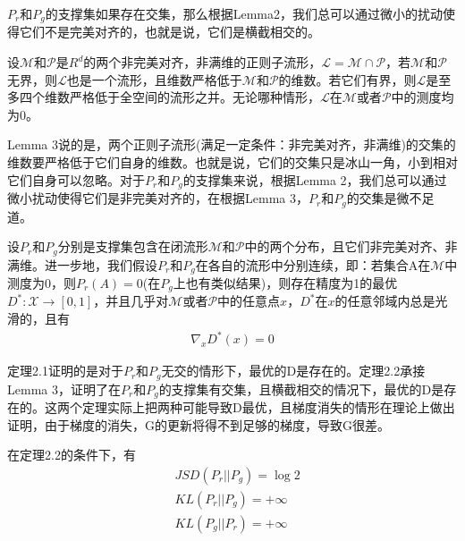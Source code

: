             $P_r$和$P_g$的支撑集如果存在交集，那么根据Lemma2，我们总可以通过微小的扰动使得它们不是完美对齐的，也就是说，它们是横截相交的。
            \begin{lemma}[Lemma 3]
            设$\mathcal{M}$和$\mathcal{P}$是$R^d$的两个非完美对齐，非满维的正则子流形，$\mathcal{L} = \mathcal{M}\cap \mathcal{P} $，若$\mathcal{M}$和$\mathcal{P}$无界，则$\mathcal{L}$也是一个流形，且维数严格低于$\mathcal{M}$和$\mathcal{P}$的维数。若它们有界，则$\mathcal{L}$是至多四个维数严格低于全空间的流形之并。无论哪种情形，$\mathcal{L}$在$\mathcal{M}$或者$\mathcal{P}$中的测度均为0。
            \end{lemma}
            \par
            Lemma 3说的是，两个正则子流形(满足一定条件：非完美对齐，非满维)的交集的维数要严格低于它们自身的维数。也就是说，它们的交集只是冰山一角，小到相对它们自身可以忽略。对于$P_r$和$P_g$的支撑集来说，根据Lemma 2，我们总可以通过微小扰动使得它们是非完美对齐的，在根据Lemma 3，$P_r$和$P_g$的交集是微不足道。
            \begin{theorem}[Theorem2.2]
            设$P_r$和$P_g$分别是支撑集包含在闭流形$\mathcal{M}$和$\mathcal{P}$中的两个分布，且它们非完美对齐、非满维。进一步地，我们假设$P_r$和$P_g$在各自的流形中分别连续，即：若集合A在$\mathcal{M}$中测度为0，则$P_r(A) = 0$(在$P_g$上也有类似结果)，则存在精度为1的最优$ D^*:\mathcal{X}\to [0,1]$，并且几乎对$\mathcal{M}$或者$\mathcal{P}$中的任意点$x$，$D^*$在$x$的任意邻域内总是光滑的，且有
            \begin{align*}
            \nabla_x D^*(x) = 0
            \end{align*}
            \end{theorem}
            \par
            定理2.1证明的是对于$P_r$和$P_g$无交的情形下，最优的D是存在的。定理2.2承接Lemma 3，证明了在$P_r$和$P_g$的支撑集有交集，且横截相交的情况下，最优的D是存在的。这两个定理实际上把两种可能导致D最优，且梯度消失的情形在理论上做出证明，由于梯度的消失，G的更新将得不到足够的梯度，导致G很差。
            \begin{theorem}[Theorem2.3]
            在定理2.2的条件下，有
            \begin{align*}
            & JSD(P_r||P_g) = \log 2\\
            & KL(P_r||P_g) = +\infty\\
            & KL(P_g||P_r) = +\infty
            \end{align*}
            \end{theorem}
            \par
